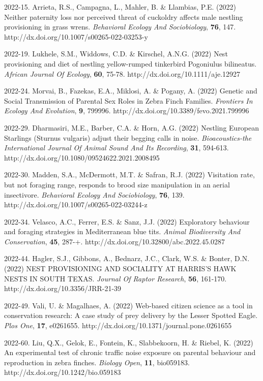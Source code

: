 2022-15. Arrieta, R.S., Campagna, L., Mahler, B. \&  Llambias, P.E. (2022) Neither paternity loss nor perceived threat of cuckoldry affects male nestling provisioning in grass wrens. \textit{Behavioral Ecology And Sociobiology},  \textbf{76}, 147. http://dx.doi.org/10.1007/s00265-022-03253-y

2022-19. Lukhele, S.M., Widdows, C.D. \&  Kirschel, A.N.G. (2022) Nest provisioning and diet of nestling yellow-rumped tinkerbird Pogoniulus bilineatus. \textit{African Journal Of Ecology},  \textbf{60}, 75-78. http://dx.doi.org/10.1111/aje.12927

2022-24. Morvai, B., Fazekas, E.A., Miklosi, A. \&  Pogany, A. (2022) Genetic and Social Transmission of Parental Sex Roles in Zebra Finch Families. \textit{Frontiers In Ecology And Evolution},  \textbf{9}, 799996. http://dx.doi.org/10.3389/fevo.2021.799996

2022-29. Dharmasiri, M.E., Barber, C.A. \&  Horn, A.G. (2022) Nestling European Starlings (Sturnus vulgaris) adjust their begging calls in noise. \textit{Bioacoustics-the International Journal Of Animal Sound And Its Recording},  \textbf{31}, 594-613. http://dx.doi.org/10.1080/09524622.2021.2008495

2022-30. Madden, S.A., McDermott, M.T. \&  Safran, R.J. (2022) Visitation rate, but not foraging range, responds to brood size manipulation in an aerial insectivore. \textit{Behavioral Ecology And Sociobiology},  \textbf{76}, 139. http://dx.doi.org/10.1007/s00265-022-03244-z

2022-34. Velasco, A.C., Ferrer, E.S. \&  Sanz, J.J. (2022) Exploratory behaviour and foraging strategies in Mediterranean blue tits. \textit{Animal Biodiversity And Conservation},  \textbf{45}, 287-+. http://dx.doi.org/10.32800/abc.2022.45.0287

2022-44. Hagler, S.J., Gibbons, A., Bednarz, J.C., Clark, W.S. \&  Bonter, D.N. (2022) NEST PROVISIONING AND SOCIALITY AT HARRIS'S HAWK NESTS IN SOUTH TEXAS. \textit{Journal Of Raptor Research},  \textbf{56}, 161-170. http://dx.doi.org/10.3356/JRR-21-39

2022-49. Vali, U. \&  Magalhaes, A. (2022) Web-based citizen science as a tool in conservation research: A case study of prey delivery by the Lesser Spotted Eagle. \textit{Plos One},  \textbf{17}, e0261655. http://dx.doi.org/10.1371/journal.pone.0261655

2022-60. Liu, Q.X., Gelok, E., Fontein, K., Slabbekoorn, H. \&  Riebel, K. (2022) An experimental test of chronic traffic noise exposure on parental behaviour and reproduction in zebra finches. \textit{Biology Open},  \textbf{11}, bio059183. http://dx.doi.org/10.1242/bio.059183

